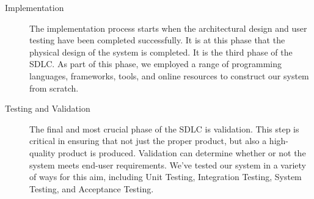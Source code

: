 \begin{description}
\item[Implementation] The implementation process starts when the architectural design and user testing have been completed successfully. It is at this phase that the physical design of the system is completed. It is the third phase of the SDLC. As part of this phase, we employed a range of programming languages, frameworks, tools, and online resources to construct our system from scratch.
\item[Testing and Validation] The final and most crucial phase of the SDLC is validation. This step is critical in ensuring that not just the proper product, but also a high-quality product is produced. Validation can determine whether or not the system meets end-user requirements. We've tested our system in a variety of ways for this aim, including Unit Testing, Integration Testing, System Testing, and Acceptance Testing.
\end{description}


